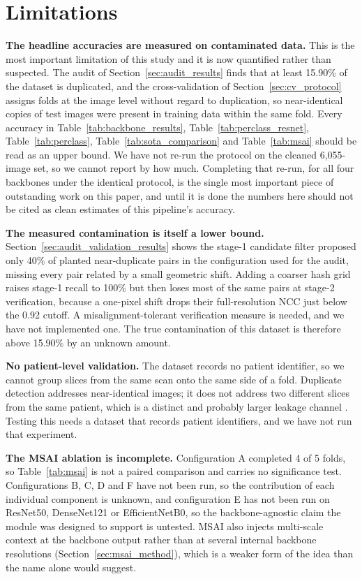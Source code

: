 \documentclass[11pt]{article}
\begin{document}
\section{Limitations}
\label{sec:limitations}

\textbf{The headline accuracies are measured on contaminated data.} This is the most important limitation of this study and it is now quantified rather than suspected. The audit of Section~\ref{sec:audit_results} finds that at least 15.90\% of the dataset is duplicated, and the cross-validation of Section~\ref{sec:cv_protocol} assigns folds at the image level without regard to duplication, so near-identical copies of test images were present in training data within the same fold. Every accuracy in Table~\ref{tab:backbone_results}, Table~\ref{tab:perclass_resnet}, Table~\ref{tab:perclass}, Table~\ref{tab:sota_comparison} and Table~\ref{tab:msai} should be read as an upper bound. We have not re-run the protocol on the cleaned 6,055-image set, so we cannot report by how much. Completing that re-run, for all four backbones under the identical protocol, is the single most important piece of outstanding work on this paper, and until it is done the numbers here should not be cited as clean estimates of this pipeline's accuracy.

\textbf{The measured contamination is itself a lower bound.} Section~\ref{sec:audit_validation_results} shows the stage-1 candidate filter proposed only 40\% of planted near-duplicate pairs in the configuration used for the audit, missing every pair related by a small geometric shift. Adding a coarser hash grid raises stage-1 recall to 100\% but then loses most of the same pairs at stage-2 verification, because a one-pixel shift drops their full-resolution NCC just below the 0.92 cutoff. A misalignment-tolerant verification measure is needed, and we have not implemented one. The true contamination of this dataset is therefore above 15.90\% by an unknown amount.

\textbf{No patient-level validation.} The dataset records no patient identifier, so we cannot group slices from the same scan onto the same side of a fold. Duplicate detection addresses near-identical images; it does not address two different slices from the same patient, which is a distinct and probably larger leakage channel \cite{varoquaux2022leakage}. Testing this needs a dataset that records patient identifiers, and we have not run that experiment.

\textbf{The MSAI ablation is incomplete.} Configuration A completed 4 of 5 folds, so Table~\ref{tab:msai} is not a paired comparison and carries no significance test. Configurations B, C, D and F have not been run, so the contribution of each individual component is unknown, and configuration E has not been run on ResNet50, DenseNet121 or EfficientNetB0, so the backbone-agnostic claim the module was designed to support is untested. MSAI also injects multi-scale context at the backbone output rather than at several internal backbone resolutions (Section~\ref{sec:msai_method}), which is a weaker form of the idea than the name alone would suggest.
\end{document}
